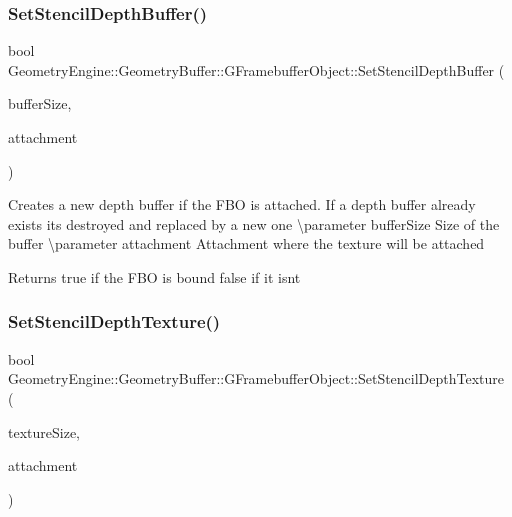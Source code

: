\subsubsection{\texorpdfstring{SetStencilDepthBuffer()}{SetStencilDepthBuffer()}}
{\footnotesize\ttfamily bool Geometry\+Engine\+::\+Geometry\+Buffer\+::\+G\+Framebuffer\+Object\+::\+Set\+Stencil\+Depth\+Buffer (\begin{DoxyParamCaption}\item[{const Q\+Vector2D \&}]{buffer\+Size,  }\item[{G\+Framebuffer\+Commons\+::\+G\+\_\+\+D\+E\+P\+T\+H\+\_\+\+S\+T\+E\+N\+C\+I\+L\+\_\+\+A\+T\+T\+A\+C\+H\+M\+E\+N\+TS}]{attachment }\end{DoxyParamCaption})}

Creates a new depth buffer if the F\+BO is attached. If a depth buffer already exists it\textquotesingle{}s destroyed and replaced by a new one \textbackslash{}parameter buffer\+Size Size of the buffer \textbackslash{}parameter attachment Attachment where the texture will be attached \begin{DoxyReturn}{Returns}
true if the F\+BO is bound false if it isn\textquotesingle{}t 
\end{DoxyReturn}
\mbox{\label{class_geometry_engine_1_1_geometry_buffer_1_1_g_framebuffer_object_a91836ba52af64e57cd6a7d0f3fce118f}} 
\subsubsection{\texorpdfstring{SetStencilDepthTexture()}{SetStencilDepthTexture()}}
{\footnotesize\ttfamily bool Geometry\+Engine\+::\+Geometry\+Buffer\+::\+G\+Framebuffer\+Object\+::\+Set\+Stencil\+Depth\+Texture (\begin{DoxyParamCaption}\item[{const Q\+Vector2D \&}]{texture\+Size,  }\item[{G\+Framebuffer\+Commons\+::\+G\+\_\+\+D\+E\+P\+T\+H\+\_\+\+S\+T\+E\+N\+C\+I\+L\+\_\+\+A\+T\+T\+A\+C\+H\+M\+E\+N\+TS}]{attachment }\end{DoxyParamCaption})}

